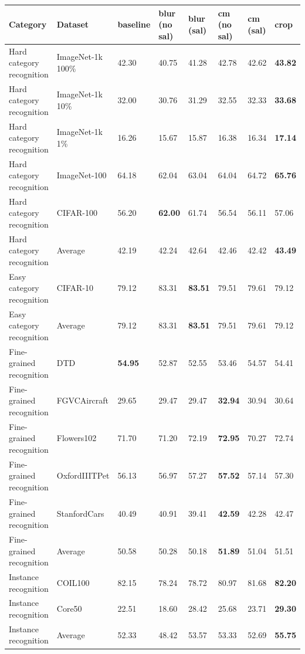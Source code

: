 \begin{tabular}{llllllll}
\toprule
Category & Dataset & baseline & blur (no sal) & blur (sal) & cm (no sal) & cm (sal) & crop \\
\midrule
\midrule
Hard category recognition & ImageNet-1k 100\% & 42.30 & 40.75 & 41.28 & 42.78 & 42.62 & \textbf{43.82} \\
Hard category recognition & ImageNet-1k 10\% & 32.00 & 30.76 & 31.29 & 32.55 & 32.33 & \textbf{33.68} \\
Hard category recognition & ImageNet-1k 1\% & 16.26 & 15.67 & 15.87 & 16.38 & 16.34 & \textbf{17.14} \\
Hard category recognition & ImageNet-100 & 64.18 & 62.04 & 63.04 & 64.04 & 64.72 & \textbf{65.76} \\
Hard category recognition & CIFAR-100 & 56.20 & \textbf{62.00} & 61.74 & 56.54 & 56.11 & 57.06 \\
Hard category recognition & Average & 42.19 & 42.24 & 42.64 & 42.46 & 42.42 & \textbf{43.49} \\
\midrule
Easy category recognition & CIFAR-10 & 79.12 & 83.31 & \textbf{83.51} & 79.51 & 79.61 & 79.12 \\
Easy category recognition & Average & 79.12 & 83.31 & \textbf{83.51} & 79.51 & 79.61 & 79.12 \\
\midrule
Fine-grained recognition & DTD & \textbf{54.95} & 52.87 & 52.55 & 53.46 & 54.57 & 54.41 \\
Fine-grained recognition & FGVCAircraft & 29.65 & 29.47 & 29.47 & \textbf{32.94} & 30.94 & 30.64 \\
Fine-grained recognition & Flowers102 & 71.70 & 71.20 & 72.19 & \textbf{72.95} & 70.27 & 72.74 \\
Fine-grained recognition & OxfordIIITPet & 56.13 & 56.97 & 57.27 & \textbf{57.52} & 57.14 & 57.30 \\
Fine-grained recognition & StanfordCars & 40.49 & 40.91 & 39.41 & \textbf{42.59} & 42.28 & 42.47 \\
Fine-grained recognition & Average & 50.58 & 50.28 & 50.18 & \textbf{51.89} & 51.04 & 51.51 \\
\midrule
Instance recognition & COIL100 & 82.15 & 78.24 & 78.72 & 80.97 & 81.68 & \textbf{82.20} \\
Instance recognition & Core50 & 22.51 & 18.60 & 28.42 & 25.68 & 23.71 & \textbf{29.30} \\
Instance recognition & Average & 52.33 & 48.42 & 53.57 & 53.33 & 52.69 & \textbf{55.75} \\
\bottomrule
\end{tabular}
